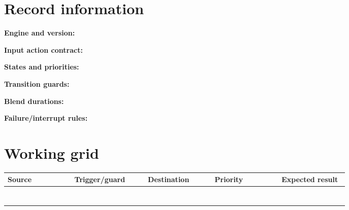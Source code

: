 \documentclass[10pt,letterpaper]{article}
\begin{document}
\makedoctitle
\makedocsummary

\section{Record information}
\noindent\textbf{Engine and version:}\quad\hrulefill\par\vspace{10pt}
\noindent\textbf{Input action contract:}\quad\hrulefill\par\vspace{10pt}
\noindent\textbf{States and priorities:}\quad\hrulefill\par\vspace{10pt}
\noindent\textbf{Transition guards:}\quad\hrulefill\par\vspace{10pt}
\noindent\textbf{Blend durations:}\quad\hrulefill\par\vspace{10pt}
\noindent\textbf{Failure/interrupt rules:}\quad\hrulefill\par\vspace{10pt}\section{Working grid}
\begin{longtable}{|p{0.156\linewidth}|p{0.156\linewidth}|p{0.156\linewidth}|p{0.156\linewidth}|p{0.156\linewidth}|}
\hline
\textbf{Source} & \textbf{Trigger/guard} & \textbf{Destination} & \textbf{Priority} & \textbf{Expected result}\\\hline
\endhead
\rule{0pt}{20pt} &  &  &  & \\\hline
\rule{0pt}{20pt} &  &  &  & \\\hline
\rule{0pt}{20pt} &  &  &  & \\\hline
\rule{0pt}{20pt} &  &  &  & \\\hline
\rule{0pt}{20pt} &  &  &  & \\\hline
\rule{0pt}{20pt} &  &  &  & \\\hline
\rule{0pt}{20pt} &  &  &  & \\\hline
\end{longtable}
\end{document}
